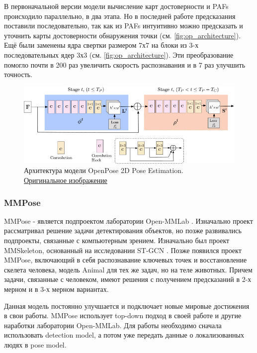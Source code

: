 В первоначальной версии модели \cite{OpenPose_first} вычисление карт достоверности и PAFs происходило параллельно, в два этапа. Но в последней работе \cite{OpenPose} предсказания поставили последовательно, так как из PAFs интуитивно можно предсказать и уточнить карты достоверности обнаружения точки (см. \autoref{fig:op_architecture}). Ещё были заменены ядра свертки размером 7х7 на блоки из 3-х последовательных ядер 3х3 (см. \autoref{fig:op_architecture}). Эти преобразование помогло почти в 200 раз увеличить скорость распознавания и в 7 раз улучшить точность.

\begin{figure}[h]
	\centering
	\includegraphics[width=\textwidth * 4 / 5]{./images/OpenPose/architecture.jpg}
	\caption{Архитектура модели OpenPose 2D Pose Estimation.\\ \href{https://ieeexplore.ieee.org/mediastore_new/IEEE/content/media/34/9280439/8765346/cao3-2929257-large.gif}{Оригинальное изображение}}
	\label{fig:op_architecture}
\end{figure}



\subsubsection{MMPose}

MMPose - является подпроектом лаборатории Open-MMLab \cite{mmpose2020}. Изначально проект рассматривал решение задачи детектирования объектов, но позже развивались подпроекты, связанные с компьютерным зрением. Изначально был проект MMSkeleton, основанный на исследовании ST-GCN \cite{STGCN}. Позже появился проект MMPose, включающий в себя распознавание ключевых точек и восстановление скелета человека, модель Animal для тех же задач, но на теле животных. Причем задачи, связанные с человеком, имеют решения с получением предсказаний в 2-х мерном и в 3-х мерном вариантах.

Данная модель постоянно улучшается и подключает новые мировые достижения в свои работы. MMPose использует top-down подход в своей работе и другие наработки лаборатории Open-MMLab. Для работы необходимо сначала использовать detection model, а потом уже передать данные о локализованных людях в pose model.

